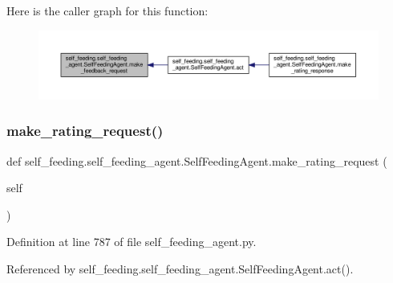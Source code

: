 Here is the caller graph for this function\+:
\nopagebreak
\begin{figure}[H]
\begin{center}
\leavevmode
\includegraphics[width=350pt]{classself__feeding_1_1self__feeding__agent_1_1SelfFeedingAgent_abb5225edea055887a8ec2da2d02b7463_icgraph}
\end{center}
\end{figure}
\mbox{\label{classself__feeding_1_1self__feeding__agent_1_1SelfFeedingAgent_abc842083fdfd34983ed64bd7dc8d8b4a}} 
\subsubsection{\texorpdfstring{make\+\_\+rating\+\_\+request()}{make\_rating\_request()}}
{\footnotesize\ttfamily def self\+\_\+feeding.\+self\+\_\+feeding\+\_\+agent.\+Self\+Feeding\+Agent.\+make\+\_\+rating\+\_\+request (\begin{DoxyParamCaption}\item[{}]{self }\end{DoxyParamCaption})}



Definition at line 787 of file self\+\_\+feeding\+\_\+agent.\+py.



Referenced by self\+\_\+feeding.\+self\+\_\+feeding\+\_\+agent.\+Self\+Feeding\+Agent.\+act().

